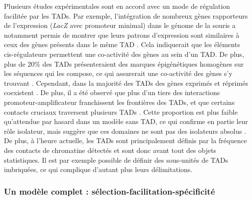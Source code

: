 Plusieurs études expérimentales sont en accord avec un mode de régulation facilitée par les \acrshort{TAD}s. Par exemple, l’intégration de nombreux gènes rapporteurs de l’expression (\textit{LacZ} avec promoteur minimal) dans le génome de la souris a notamment permis de montrer que leurs patrons d’expression sont similaires à ceux des gènes présents dans le même \acrshort{TAD} \citep{symmons_functional_2014}. Cela indiquerait que les éléments \gls{cis}-régulateurs permettent une co-activité des gènes au sein d’un \acrshort{TAD}. De plus, plus de 20\% des \acrshort{TAD}s présenteraient des marques épigénétiques homogènes sur les séquences qui les compose, ce qui assurerait une co-activité des gènes s’y trouvant \citep{le_dily_distinct_2014}. Cependant, dans la majorité des \acrshort{TAD}s des gènes exprimés et réprimés coexistent \citep{le_dily_distinct_2014}. De plus, il a été observé que plus d’un tiers des interactions promoteur-\gls{amplificateur} franchissent les frontières des \acrshort{TAD}s, et que certains contacts cruciaux traversent plusieurs \acrshort{TAD}s \citep{javierre_lineage-specific_2016}. Cette proportion est plus faible qu’attendue par hasard dans un modèle sans \acrshort{TAD}, ce qui confirme en partie leur rôle isolateur, mais suggère que ces domaines ne sont pas des isolateurs absolus \citep{schoenfelder_long-range_2019}. De plus, à l’heure actuelle, les \acrshort{TAD}s sont principalement définis par la fréquence des contacts de chromatine détectés et sont donc avant tout des objets statistiques. Il est par exemple possible de définir des sous-unités de \acrshort{TAD}s imbriquées, ce qui complique d’autant plus leurs délimitations.

\subsubsection{Un modèle complet : sélection-facilitation-spécificité}
\label{subsubsec:modele-complet}

